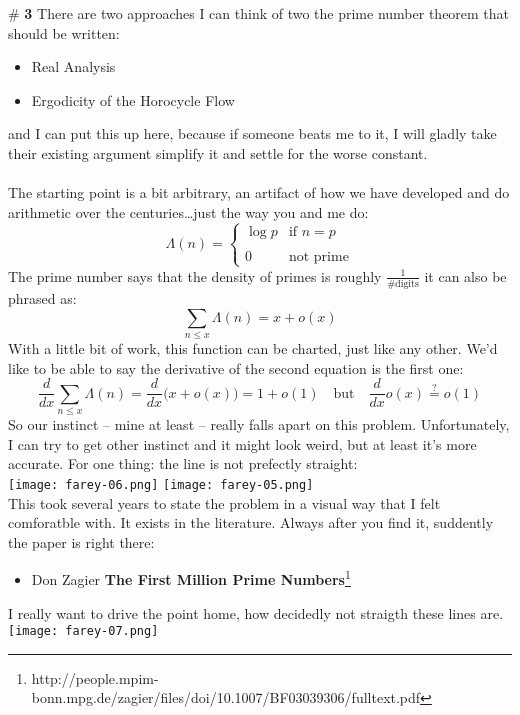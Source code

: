 \documentclass[12pt]{article}
\begin{document}
\newpage

\noindent \# \textbf{3} There are two approaches I can think of two the prime number theorem that should be written:
\begin{itemize}
\item Real Analysis
\item Ergodicity of the Horocycle Flow
\end{itemize}
and I can put this up here, because if someone beats me to it, I will gladly take their existing argument simplify it and settle for the worse constant.  \\ \\
The starting point is a bit arbitrary, an artifact of how we have developed and do arithmetic over the centuries\dots just the way you and me do:
$$ \Lambda(n) = \left\{ \begin{array}{cl} \log p & \text{if }n=p \\ \\
0 & \text{not prime}\end{array} \right. $$
The prime number says that the density of primes is roughly $ \frac{1}{\text{\# digits}} $ it can also be phrased as:
$$ \sum_{n \leq x} \Lambda(n)  = x + o(x) $$
With a little bit of work, this function can be charted, just like any other. 
We'd like to be able to say the derivative of the second equation is the first one:
$$ \frac{d}{dx} \sum_{n \leq x} \Lambda(n)  = \frac{d}{dx}  \big( x + o(x) \big) = 1 + o(1)  \quad\text{but}\quad \frac{d}{dx} o(x) \stackrel{?}{=} o(1)$$
So our instinct -- mine at least -- really falls apart on this problem.  Unfortunately, I can try to get other instinct and it might look weird, but at least it's more accurate.  For one thing: the line is not prefectly straight: \\
\texttt{[image: farey-06.png]}\hfill
\texttt{[image: farey-05.png]}\\
This took several years to state the problem in a visual way that I felt comforatble with.  It exists in the literature.  Always after you find it, suddently the paper is right there:
\begin{itemize}
\item Don Zagier \textbf{The First Million Prime Numbers}\footnote{http://people.mpim-bonn.mpg.de/zagier/files/doi/10.1007/BF03039306/fulltext.pdf}
\end{itemize}
I really want to drive the point home, how decidedly not straigth these lines are. \\
\texttt{[image: farey-07.png]} \\ 
\end{document}
